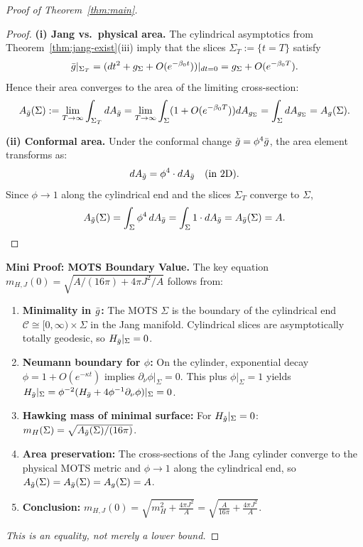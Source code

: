 \begin{proof}[Proof of Theorem~\ref{thm:main}]
\begin{proof}
\textbf{(i) Jang vs.\ physical area.}
The cylindrical asymptotics from Theorem~\ref{thm:jang-exist}(iii) imply that the slices $\Sigma_T:=\{t=T\}$ satisfy
\[
\bar{g}|_{\Sigma_T} = (dt^2 + g_\Sigma + O(e^{-\beta_0 t}))|_{dt=0} = g_\Sigma + O(e^{-\beta_0 T}).
\]
Hence their area converges to the area of the limiting cross-section:
\[
A_{\bar{g}}(\Sigma) := \lim_{T \to \infty} \int_{\Sigma_T} dA_{\bar{g}} = \lim_{T \to \infty} \int_\Sigma (1 + O(e^{-\beta_0 T})) dA_{g_\Sigma} = \int_\Sigma dA_{g_\Sigma} = A_g(\Sigma).
\]

\textbf{(ii) Conformal area.}
Under the conformal change $\tilde{g} = \phi^4 \bar{g}$, the area element transforms as:
\[
dA_{\tilde{g}} = \phi^4 \cdot dA_{\bar{g}} \quad \text{(in 2D)}.
\]
Since $\phi \to 1$ along the cylindrical end and the slices $\Sigma_T$ converge to $\Sigma$,
\[
A_{\tilde{g}}(\Sigma) = \int_\Sigma \phi^4 \, dA_{\bar{g}} = \int_\Sigma 1 \cdot dA_{\bar{g}} = A_{\bar{g}}(\Sigma) = A.
\]
\end{proof}

\textbf{Mini Proof: MOTS Boundary Value.}\label{box:mots-mini-proof}
The key equation $m_{H,J}(0) = \sqrt{A/(16\pi) + 4\pi J^2/A}$ follows from:
\begin{enumerate}[label=\textup{(\arabic*)}, leftmargin=2em, itemsep=1pt]
    \item \textbf{Minimality in $\bar{g}$:} The MOTS $\Sigma$ is the boundary of the cylindrical end $\mathcal{C} \cong [0,\infty) \times \Sigma$ in the Jang manifold. Cylindrical slices are asymptotically totally geodesic, so $H_{\bar{g}}|_\Sigma = 0$.
    
    \item \textbf{Neumann boundary for $\phi$:} On the cylinder, exponential decay $\phi = 1 + O(e^{-\kappa t})$ implies $\partial_\nu\phi|_\Sigma = 0$. This plus $\phi|_\Sigma = 1$ yields $H_{\tilde{g}}|_\Sigma = \phi^{-2}(H_{\bar{g}} + 4\phi^{-1}\partial_\nu\phi)|_\Sigma = 0$.
    
    \item \textbf{Hawking mass of minimal surface:} For $H_{\tilde{g}}|_\Sigma = 0$: $m_H(\Sigma) = \sqrt{A_{\tilde{g}}(\Sigma)/(16\pi)}$.
    
    \item \textbf{Area preservation:} The cross-sections of the Jang cylinder converge to the physical MOTS metric and $\phi \to 1$ along the cylindrical end, so $A_{\tilde{g}}(\Sigma) = A_{\bar{g}}(\Sigma) = A_g(\Sigma) = A$.
    
    \item \textbf{Conclusion:} $\displaystyle m_{H,J}(0) = \sqrt{m_H^2 + \frac{4\pi J^2}{A}} = \sqrt{\frac{A}{16\pi} + \frac{4\pi J^2}{A}}$.
\end{enumerate}
\vspace{-0.5em}
\textit{This is an equality, not merely a lower bound.}
\vspace{0.3cm}


\end{proof}

